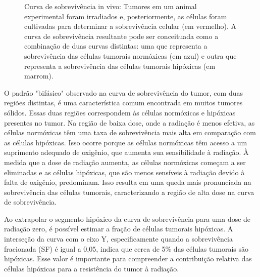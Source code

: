 \documentclass[11pt,a4paper]{article}
\begin{document}
	\begin{figure}[h]
		\centering
		\caption{Curva de sobrevivência in vivo: Tumores em um animal experimental foram irradiados e, posteriormente, as células foram cultivadas para determinar a sobrevivência celular (em vermelho). A curva de sobrevivência resultante pode ser conceituada como a combinação de duas curvas distintas: uma que representa a sobrevivência das células tumorais normóxicas (em azul) e outra que representa a sobrevivência das células tumorais hipóxicas (em marrom).}
		\label{fig:medidaDiretaHipoxia}
	\end{figure}

	O padrão "bifásico" observado na curva de sobrevivência do tumor, com duas regiões distintas, é uma característica comum encontrada em muitos tumores sólidos. Essas duas regiões correspondem às células normóxicas e hipóxicas presentes no tumor. Na região de baixa dose, onde a radiação é menos efetiva, as células normóxicas têm uma taxa de sobrevivência mais alta em comparação com as células hipóxicas. Isso ocorre porque as células normóxicas têm acesso a um suprimento adequado de oxigênio, que aumenta sua sensibilidade à radiação. À medida que a dose de radiação aumenta, as células normóxicas começam a ser eliminadas e as células hipóxicas, que são menos sensíveis à radiação devido à falta de oxigênio, predominam. Isso resulta em uma queda mais pronunciada na sobrevivência das células tumorais, caracterizando a região de alta dose na curva de sobrevivência.

	Ao extrapolar o segmento hipóxico da curva de sobrevivência para uma dose de radiação zero, é possível estimar a fração de células tumorais hipóxicas. A interseção da curva com o eixo Y, especificamente quando a sobrevivência fracionada (SF) é igual a 0,05, indica que cerca de 5\% das células tumorais são hipóxicas. Esse valor é importante para compreender a contribuição relativa das células hipóxicas para a resistência do tumor à radiação.
\end{document}
